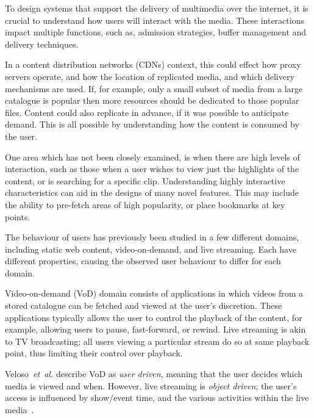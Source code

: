 To design systems that support the delivery of multimedia over the internet, it is crucial to understand how users will interact with the media. These interactions impact multiple functions, such as, admission strategies, buffer management and delivery techniques.

In a content distribution networks (CDNs) context, this could effect how proxy servers operate, and how the location of replicated media, and which delivery mechanisms are used. If, for example, only a small subset of media from a large catalogue is popular then more resources should be dedicated to those popular files. Content could also replicate in advance, if it was possible to anticipate demand. This is all possible by understanding how the content is consumed by the user.

One area which has not been closely examined, is when there are high levels of interaction, such as those when a user wishes to view just the highlights of the content, or is searching for a specific clip. Understanding highly interactive characteristics can aid in the designs of many novel features. This may include the ability to pre-fetch areas of high popularity, or place bookmarks at key points.

The behaviour of users has previously been studied in a few different domains, including static web content, video-on-demand, and live streaming. Each have different properties, causing the observed user behaviour to differ for each domain.

Video-on-demand (VoD) domain consists of applications in which videos from a stored catalogue can be fetched and viewed at the user's discretion. These applications typically allows the user to control the playback of the content, for example, allowing users to pause, fast-forward, or rewind. Live streaming is akin to TV broadcasting; all users viewing a particular stream do so at same playback point, thus limiting their control over playback.

Veloso~\emph{et~al.} describe VoD as \emph{user driven}, meaning that the user decides which media is viewed and when. However, live streaming is \emph{object driven}; the user's access is influenced by show/event time, and the various activities within the live media~\cite{veloso2002hcl}.



